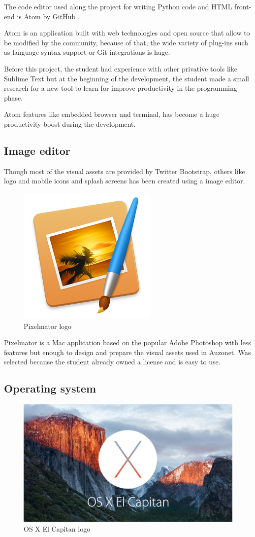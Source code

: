 \documentclass{DeustoFDP}
\begin{document}
The code editor used along the project for writing Python code and HTML front-end is Atom by GitHub \cite{atom}.

Atom is an application built with web technologies and open source that allow to be modified by the community, because of that, the wide variety of plug-ins such as language syntax support or Git integrations is huge.

Before this project, the student had experience with other privative tools like Sublime Text but at the beginning of the development, the student made a small research for a new tool to learn for improve productivity in the programming phase.

Atom features like embedded browser and terminal, has become a huge productivity boost during the development.
\subsection{Image editor}
Though most of the visual assets are provided by Twitter Bootstrap, others like logo and mobile icons and splash screens has been created using a image editor.

\begin{figure}[h]
\centering
\includegraphics[width=0.3\linewidth]{fig/pixelmator}
\caption[Pixelmator logo]{Pixelmator logo}
\label{fig:pixelmator}
\end{figure}


Pixelmator is a Mac application based on the popular Adobe Photoshop with less features but enough to design and prepare the visual assets used in Auzonet. Was selected because the student already owned a license and is easy to use.

\subsection{Operating system}
\begin{figure}[h]
\centering
\includegraphics[width=0.7\linewidth]{fig/osxelcapitan}
\caption[OS X El Capitan logo]{OS X El Capitan logo}
\label{fig:osxelcapitan}
\end{figure}
\end{document}
